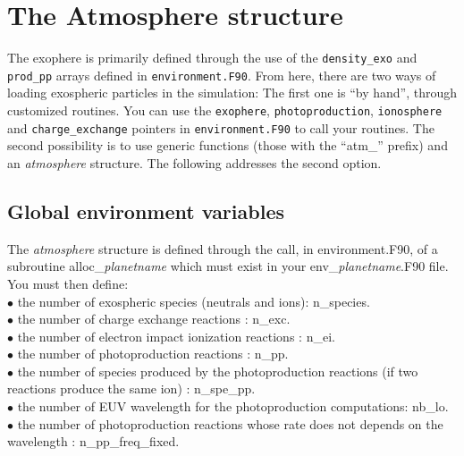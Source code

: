 \documentclass{article}
\begin{document}
\section{The Atmosphere structure}
The exophere is primarily defined through the use of the {\tt density\_exo} and {\tt prod\_pp} arrays defined in {\tt environment.F90}. From here, there are two ways of loading exospheric particles in the simulation: The first one is ``by hand'', through customized routines. You can use the {\tt exophere}, {\tt photoproduction}, {\tt ionosphere} and {\tt charge\_exchange} pointers in {\tt environment.F90} to call your routines. The second possibility is to use generic functions (those with the ``atm\_'' prefix) and an {\it atmosphere} structure. The following addresses the second option.\\


\subsection{Global environment variables}
The {\it atmosphere} structure is defined through the call, in {\sf environment.F90}, of a subroutine {\sf alloc\_}{\it planetname} which must exist in your {\sf env\_}{\it planetname}{\sf .F90} file. You must then define:\\
$\bullet$ the number of exospheric species (neutrals and ions): n\_species.\\
$\bullet$ the number of charge exchange reactions : n\_exc.\\
$\bullet$ the number of electron impact ionization reactions : n\_ei.\\
$\bullet$ the number of photoproduction reactions : n\_pp.\\
$\bullet$ the number of species produced by the photoproduction reactions (if two reactions produce the same ion) : n\_spe\_pp.\\
$\bullet$ the number of EUV wavelength for the photoproduction computations: nb\_lo.\\
$\bullet$ the number of photoproduction reactions whose rate does not depends on the wavelength : n\_pp\_freq\_fixed.\\
\end{document}
